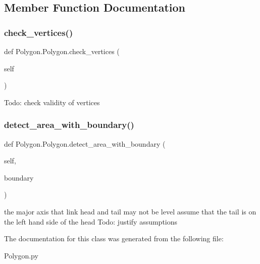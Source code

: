 \subsection{Member Function Documentation}
\mbox{\label{class_polygon_1_1_polygon_ad6cc83b96e3700ea32fbffc9885e2c8e}} 
\subsubsection{\texorpdfstring{check\_vertices()}{check\_vertices()}}
{\footnotesize\ttfamily def Polygon.\+Polygon.\+check\+\_\+vertices (\begin{DoxyParamCaption}\item[{}]{self }\end{DoxyParamCaption})}

\begin{DoxyVerb}Todo: check validity of vertices\end{DoxyVerb}
 \mbox{\label{class_polygon_1_1_polygon_a5a9ce3ae8751ce80222c5e5d2d38cc53}} 
\subsubsection{\texorpdfstring{detect\_area\_with\_boundary()}{detect\_area\_with\_boundary()}}
{\footnotesize\ttfamily def Polygon.\+Polygon.\+detect\+\_\+area\+\_\+with\+\_\+boundary (\begin{DoxyParamCaption}\item[{}]{self,  }\item[{}]{boundary }\end{DoxyParamCaption})}

\begin{DoxyVerb}    the major axis that link head and tail may not be level
    assume that the tail is on the left hand side of the head
    Todo: justify assumptions
\end{DoxyVerb}
 

The documentation for this class was generated from the following file\+:\begin{DoxyCompactItemize}
\item 
Polygon.\+py\end{DoxyCompactItemize}

